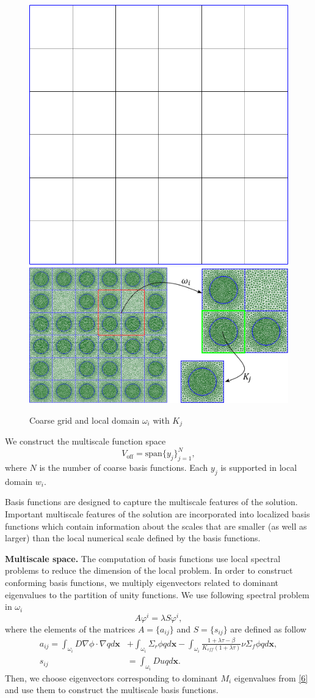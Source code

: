 \documentclass[10pt]{article}
\begin{document}
\begin{figure}[h!]
\centering
\includegraphics[width=0.3\linewidth]{coarse_grid.png}
\hspace{2em}
\includegraphics[width=0.57\linewidth]{omega.png} 
\caption{Coarse grid and local domain $\omega_i$ with $K_j$}
\label{p1}
\end{figure} 

We construct the multiscale function space
\[
{V}_{\text{off}} = \mbox{span} \{ y_j \}_{j=1}^{N},
\]
where $N$ is the number of coarse basis functions.
Each $y_j$ is supported in local domain $w_i$.

Basis functions are designed to capture the multiscale features of the solution. 
Important multiscale features of the solution are incorporated into localized basis functions which contain information about the scales that are smaller (as well as larger) than the local numerical scale defined by the basis functions. 

\textbf{Multiscale space.}
The computation of basis functions use local spectral problems to reduce the dimension of the local problem. 
In order to construct conforming basis functions, we multiply eigenvectors related to dominant eigenvalues to the partition of unity functions.
We use following spectral problem in $\omega_i$
\begin{equation} \label{8}
A \varphi^i = \lambda S \varphi^i,
\end{equation} 
where the elements of the matrices $A= \{ a_{ij} \}$ and $S = \{ s_{ij} \}$ are defined as follow{
\begin{equation} \label{9}
\begin{split}
a_{ij} = 
\int_{\omega_i} D \nabla\phi \cdot \nabla q d\bm x &+ 
\int_{\omega_i} \Sigma_r \phi q d\bm x - 
\int_{\omega_i} \frac{1+\lambda\tau-\beta}{K_{eff}(1+\lambda\tau)} \nu \Sigma_f \phi q d\bm x, \\
s_{ij} &= \int_{\omega _i} D u q d\bm x.
\end{split}
\end{equation}}
Then, we choose eigenvectors corresponding to dominant $M_{i}$ eigenvalues from \eqref{6} and use them to construct the multiscale basis functions.
\end{document}
